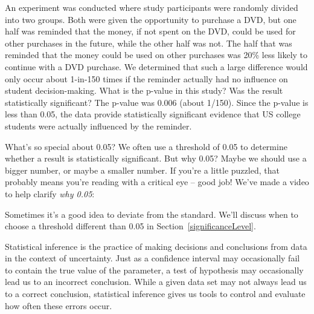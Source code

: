 
\begin{examplewrap}
\begin{nexample}{An experiment was conducted where study participants were randomly divided into two groups. Both were given the opportunity to purchase a DVD, but one half was reminded that the money, if not spent on the DVD, could be used for other purchases in the future, while the other half was not. The half that was reminded that the money could be used on other purchases was 20\% less likely to continue with a DVD purchase. We determined that such a large difference would only occur about 1-in-150 times if the reminder actually had no influence on student decision-making. What is the p-value in this study? Was the result statistically significant?}
The p-value was 0.006 (about 1/150). Since the p-value is less than 0.05, the data provide statistically significant evidence that US college students were actually influenced by the reminder.
\end{nexample}
\end{examplewrap}

\begin{onebox}{What's so special about 0.05?}
We often use a threshold of 0.05 to determine whether a result is statistically significant. But why 0.05? Maybe we should use a bigger number, or maybe a smaller number. If you're a little puzzled, that probably means you're reading with a critical eye -- good job! We've made a video to help clarify \emph{why 0.05}:
\begin{center}
\end{center}
Sometimes it's a good idea to deviate from the standard. We'll discuss when to choose a threshold different than 0.05 in Section~\ref{significanceLevel}.\vspace{0.5mm}\end{onebox}

Statistical inference is the practice of making decisions and conclusions from data in the context of uncertainty. Just as a confidence interval may occasionally fail to contain the true value of the parameter, a test of hypothesis may occasionally lead us to an incorrect conclusion. While a given data set may not always lead us to a correct conclusion, statistical inference gives us tools to control and evaluate how often these errors occur.


